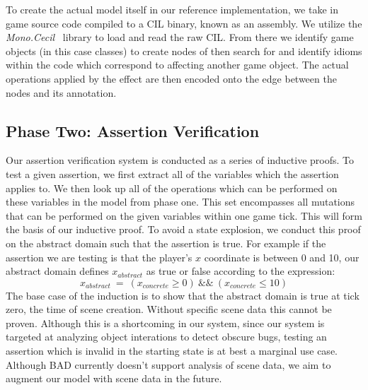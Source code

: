 \documentclass[letterpaper,twocolumn,10pt]{article}
\begin{document}
To create the actual model itself in our reference implementation, we take in game source code compiled to a CIL binary, known as an assembly. We utilize the \textit{Mono.Cecil}~\cite{Mono.Cecil} library to load and read the raw CIL. From there we identify game objects (in this case classes) to create nodes of then search for and identify idioms within the code which correspond to affecting another game object. The actual operations applied by the effect are then encoded onto the edge between the nodes and its annotation. \\

\subsection{Phase Two: Assertion Verification}

Our assertion verification system is conducted as a series of inductive proofs. To test a given assertion, we first extract all of the variables which the assertion applies to. We then look up all of the operations which can be performed on these variables in the model from phase one. This set encompasses all mutations that can be performed on the given variables within one game tick. This will form the basis of our inductive proof. To avoid a state explosion, we conduct this proof on the abstract domain such that the assertion is true. For example if the assertion we are testing is that the player's $x$ coordinate is between 0 and 10, our abstract domain defines $x_{abstract}$ as true or false according to the expression:
\begin{displaymath}x_{abstract}~=~(x_{concrete}\geq0)~\&\&~(x_{concrete}\leq10)
\end{displaymath}
The base case of the induction is to show that the abstract domain is true at tick zero, the time of scene creation. Without specific scene data this cannot be proven. Although this is a shortcoming in our system, since our system is targeted at analyzing object interations to detect obscure bugs, testing an assertion which is invalid in the starting state is at best a marginal use case. Although BAD currently doesn't support analysis of scene data, we aim to augment our model with scene data in the future.
\end{document}
